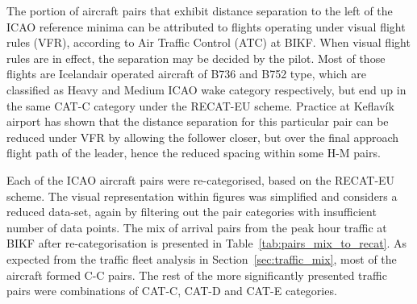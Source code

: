 The portion of aircraft pairs that exhibit distance separation to the left of the ICAO reference minima can be attributed to flights operating under visual flight rules (VFR), according to Air Traffic Control (ATC) at BIKF. When visual flight rules are in effect, the separation may be decided by the pilot. Most of those flights are Icelandair operated aircraft of B736 and B752 type, which are classified as Heavy and Medium ICAO wake category respectively, but end up in the same CAT-C category under the  RECAT-EU scheme. Practice at Keflavík airport has shown that the distance separation for this particular pair can be reduced under VFR by allowing the follower closer, but over the final approach flight path of the leader, hence the reduced spacing within some H-M pairs.

Each of the ICAO aircraft pairs were re-categorised, based on the RECAT-EU scheme. The visual representation within figures was simplified and considers a reduced data-set, again by filtering out the pair categories with insufficient number of data points. The mix of arrival pairs from the peak hour traffic at BIKF after re-categorisation is presented in Table~\ref{tab:pairs_mix_to_recat}. As expected from the traffic fleet analysis in Section~\ref{sec:traffic_mix}, most of the aircraft formed C-C pairs. The rest of the more significantly presented traffic pairs were combinations of CAT-C, CAT-D and CAT-E categories. 

